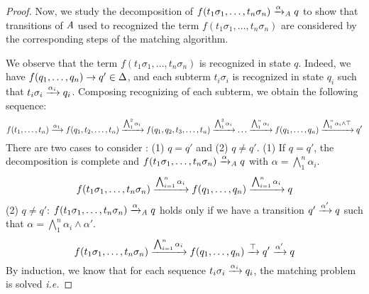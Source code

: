 \begin{proof}
  Now, we study the decomposition of $f(t_1\sigma_1,\dots, t_n\sigma_n) \xrightarrow{\alpha}_\mathit A q$ to show that transitions of $\mathit A$ used
  to recognized the term $f(t_1\sigma_1,\dots, t_n\sigma_n)$ are considered by the corresponding steps of the matching algorithm.

  We observe that the term $f(t_1\sigma_1,\dots, t_n\sigma_n)$ is recognized in state $q$. Indeed, we have $f(q_1,\dots, q_n) \rightarrow q' \in \Delta$, and each subterm
  $t_i\sigma_i$ is recognized in state $q_i$ such that $t_i\sigma_i \xrightarrow{\alpha_i} q_i$. 
  Composing recognizing of each subterm, we obtain the following sequence:
  \[
  f(t_1,\dots, t_n) \xrightarrow{\alpha_1} f(q_1, t_2, \dots, t_n) \xrightarrow{\bigwedge_1^2 \alpha_i} f(q_1, q_2, t_3, \dots, t_n) \xrightarrow{\bigwedge_1^3 \alpha_i} 
  \dots \xrightarrow{\bigwedge_1^n\alpha_i} f(q_1,\dots, q_n) \xrightarrow{\bigwedge_1^n \alpha_i \land \top} q'\]
  There are two cases to consider : (1) $q=q'$ and (2) $q \not = q'$.
  (1) If $q=q'$, the decomposition is complete and $f(t_1\sigma_1,\dots, t_n\sigma_n) \xrightarrow{\alpha}_\mathit A q$ with $\alpha = \bigwedge_1^n \alpha_i$.
  \[f(t_1\sigma_1,\dots, t_n\sigma_n) \xrightarrow{\bigwedge_{i = 1}^n \alpha_i} f(q_1,\dots,q_n) \xrightarrow{\bigwedge_{i = 1}^n \alpha_i} q\]
  (2) $q \not = q'$: $f(t_1\sigma_1,\dots, t_n\sigma_n) \xrightarrow{\alpha}_\mathit A q$ holds only if we have a transition $q' \xrightarrow{\alpha'} q$
  such that $\alpha = \bigwedge_1^n \alpha_i \land \alpha'$.
  \[f(t_1\sigma_1,\dots, t_n\sigma_n) \xrightarrow{\bigwedge_{i = 1}^n \alpha_i} f(q_1,\dots,q_n) \xrightarrow{\top} q' \xrightarrow{\alpha'} q\]
  By induction, we know that for each sequence $t_i\sigma_i
  \xrightarrow{\alpha_i} q_i$, the matching problem is solved {\it i.e.}

\end{proof}
